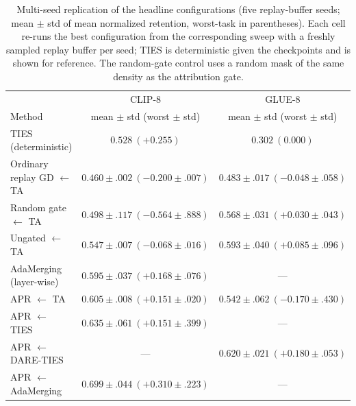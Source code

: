 \documentclass[11pt]{article}
\begin{document}
\begin{table}[t]
\centering
\small
\caption{Multi-seed replication of the headline configurations (five replay-buffer seeds; mean $\pm$ std of mean normalized retention, worst-task in parentheses). Each cell re-runs the best configuration from the corresponding sweep with a freshly sampled replay buffer per seed; TIES is deterministic given the checkpoints and is shown for reference. The random-gate control uses a random mask of the same density as the attribution gate.}
\label{tab:multiseed}
\begin{tabular}{lcc}
\toprule
 & CLIP-8 & GLUE-8 \\
Method & mean $\pm$ std (worst $\pm$ std) & mean $\pm$ std (worst $\pm$ std) \\
\midrule
TIES (deterministic)          & $0.528\ (+0.255)$ & $0.302\ (0.000)$ \\
Ordinary replay GD $\leftarrow$ TA & $0.460\pm.002\ (-0.200\pm.007)$ & $0.483\pm.017\ (-0.048\pm.058)$ \\
Random gate $\leftarrow$ TA   & $0.498\pm.117\ (-0.564\pm.888)$ & $0.568\pm.031\ (+0.030\pm.043)$ \\
Ungated $\leftarrow$ TA       & $0.547\pm.007\ (-0.068\pm.016)$ & $0.593\pm.040\ (+0.085\pm.096)$ \\
AdaMerging (layer-wise)       & $0.595\pm.037\ (+0.168\pm.076)$ & --- \\
APR $\leftarrow$ TA           & $0.605\pm.008\ (+0.151\pm.020)$ & $0.542\pm.062\ (-0.170\pm.430)$ \\
APR $\leftarrow$ TIES         & $0.635\pm.061\ (+0.151\pm.399)$ & --- \\
APR $\leftarrow$ DARE-TIES    & --- & $0.620\pm.021\ (+0.180\pm.053)$ \\
APR $\leftarrow$ AdaMerging   & $\mathbf{0.699\pm.044}\ (+0.310\pm.223)$ & --- \\
\bottomrule
\end{tabular}
\end{table}
\end{document}
